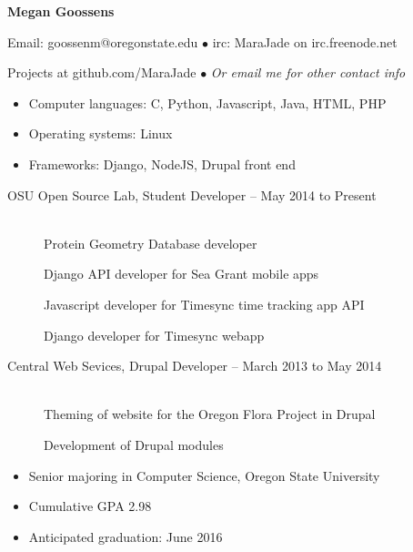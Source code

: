\documentclass[11pt]{article}
\begin{document}
\centerline{{\LARGE \bf Megan Goossens}}

\bigskip

\centerline{Email: goossenm@oregonstate.edu
        $\bullet$
        irc: MaraJade on irc.freenode.net}
\centerline{Projects at github.com/MaraJade 
        $\bullet$
        \emph{Or email me for other contact info}}

\smallskip
\hrulefill
\bigskip

\begin{itemize}
  \item Computer languages: C, Python, Javascript, Java, HTML, PHP

  \item Operating systems: Linux

  \item Frameworks: Django, NodeJS, Drupal front end
\end{itemize}

\bigskip
\hrulefill
\bigskip

\begin{description}
\item[OSU Open Source Lab, Student Developer -- May 2014 to Present]
    \hfill \\
    Protein Geometry Database developer

    Django API developer for Sea Grant mobile apps

    Javascript developer for Timesync time tracking app API

    Django developer for Timesync webapp
\end{description}


\begin{description}
\item[Central Web Sevices, Drupal Developer -- March 2013 to May 2014]
    \hfill \\
    Theming of website for the Oregon Flora Project in Drupal
    
    Development of Drupal modules
\end{description}

\smallskip
\hrulefill
\bigskip

\begin{itemize}
    \item Senior majoring in Computer Science, Oregon State University 

    \item Cumulative GPA 2.98

    \item Anticipated graduation: June 2016 
\end{itemize}
\end{document}

